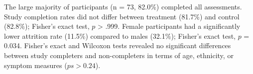 \documentclass[
  man,floatsintext]{apa7}
\begin{document}
The large majority of participants (n = 73, 82.0\%) completed all assessments.
Study completion rates did not differ between treatment (81.7\%) and control (82.8\%); Fisher's exact test, \(p\) \textgreater{} .999.
Female participants had a significantly lower attrition rate (11.5\%) compared to males (32.1\%); Fisher's exact test, \(p\) = 0.034.
Fisher's exact and Wilcoxon tests revealed no significant differences between study completers and non-completers in terms of age, ethnicity, or symptom measures (\(ps > 0.24\)).



\begin{table}[tbp]

\begin{center}
\begin{threeparttable}

\caption{\label{tab:demographics}Pre-treatment and Demographic Characteristics of Sample.}


\end{threeparttable}
\end{center}
\end{table}
\end{document}
